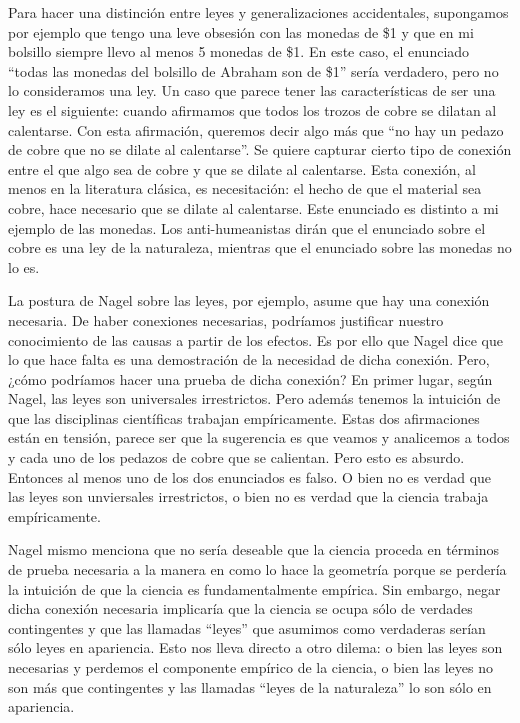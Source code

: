 Para hacer una distinción entre leyes y generalizaciones accidentales, supongamos por ejemplo que tengo una leve obsesión con las monedas de \$1 y que en mi bolsillo siempre llevo al menos 5 monedas de \$1. En este caso, el enunciado ``todas las monedas del bolsillo de Abraham son de \$1'' sería verdadero, pero no lo consideramos una ley. Un caso que parece tener las características de ser una ley es el siguiente: cuando afirmamos que todos los trozos de cobre se dilatan al calentarse.  Con esta afirmación, queremos decir algo más que ``no hay un pedazo de cobre que no se dilate al calentarse''. Se quiere capturar cierto tipo de conexión entre el que algo sea de cobre y que se dilate al calentarse. Esta conexión, al menos en la literatura clásica, es necesitación: el hecho de que el material sea cobre, hace necesario que se dilate al calentarse. Este enunciado es distinto a mi ejemplo de las monedas. Los anti-humeanistas dirán que el enunciado sobre el cobre es una ley de la naturaleza, mientras que el enunciado sobre las monedas no lo es.

La postura de Nagel sobre las leyes, por ejemplo, asume que hay una conexión necesaria. De haber conexiones necesarias, podríamos justificar nuestro conocimiento de las causas a partir de los efectos. Es por ello que Nagel dice que lo que hace falta es una demostración de la necesidad de dicha conexión. Pero, ¿cómo podríamos hacer una prueba de dicha conexión? En primer lugar, según Nagel, las leyes son universales irrestrictos. Pero además tenemos la intuición de que las disciplinas científicas trabajan empíricamente. Estas dos afirmaciones están en tensión, parece ser que la sugerencia es que veamos y analicemos a todos y cada uno de los pedazos de cobre que se calientan. Pero esto es absurdo. Entonces al menos uno de los dos enunciados es falso. O bien no es verdad que las leyes son unviersales irrestrictos, o bien no es verdad que la ciencia trabaja empíricamente.

Nagel mismo menciona que no sería deseable que la ciencia proceda en términos de prueba necesaria a la manera en como lo hace la geometría \cite[cfr., p. 53]{Nagel2006} porque se perdería la intuición de que la ciencia es fundamentalmente empírica. Sin embargo, negar dicha conexión necesaria implicaría que la ciencia se ocupa sólo de verdades contingentes  y que las llamadas ``leyes'' que asumimos como verdaderas serían sólo leyes en apariencia. Esto nos lleva directo a otro dilema: o bien las leyes son necesarias y perdemos el componente empírico de la ciencia, o bien las leyes no son más que contingentes y las llamadas ``leyes de la naturaleza'' lo son sólo en apariencia.

